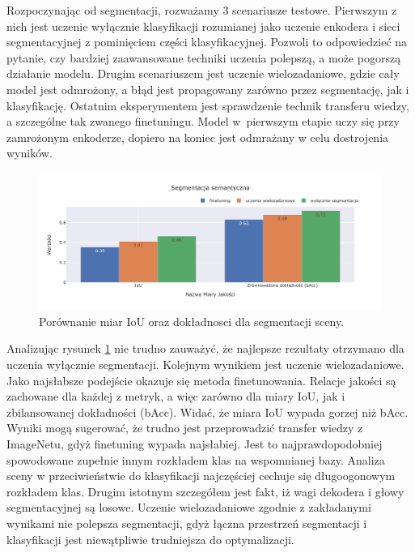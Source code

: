 \vspace{0.5cm}
Rozpoczynając od segmentacji, rozważamy 3 scenariusze testowe. Pierwszym z nich jest uczenie wyłącznie klasyfikacji rozumianej jako uczenie enkodera i sieci segmentacyjnej z pominięciem części klasyfikacyjnej. Pozwoli to odpowiedzieć na pytanie, czy bardziej zaawansowane techniki uczenia polepszą, a może pogorszą działanie modelu. Drugim scenariuszem jest uczenie wielozadaniowe, gdzie cały model jest odmrożony, a błąd jest propagowany zarówno przez segmentację, jak i klasyfikację. Ostatnim eksperymentem jest sprawdzenie technik transferu wiedzy, a szczególne tak zwanego finetuningu. Model w~pierwszym etapie uczy się przy zamrożonym enkoderze, dopiero na koniec jest odmrażany w celu dostrojenia wyników.

\begin{figure}[ht!]
    \centering
    \includegraphics[width=\textwidth]{img/pl-res/Segmentacja-semantyczna.jpeg}
    \caption{Porównanie miar IoU oraz dokładnosci dla segmentacji sceny.}
    \label{fig:macro-segmentation}
\end{figure}

Analizując rysunek \ref{fig:macro-segmentation} nie trudno zauważyć, że najlepsze rezultaty otrzymano dla uczenia wyłącznie segmentacji. Kolejnym wynikiem jest uczenie wielozadaniowe. Jako najsłabsze podejście okazuje się metoda finetunowania. Relacje jakości są zachowane dla każdej z metryk, a więc zarówno dla miary IoU, jak i zbilansowanej dokładności (bAcc). Widać, że miara IoU wypada gorzej niż bAcc. Wyniki mogą sugerować, że trudno jest przeprowadzić transfer wiedzy z ImageNetu, gdyż finetuning wypada najsłabiej. Jest to najprawdopodobniej spowodowane zupełnie innym rozkładem klas na wspomnianej bazy. Analiza sceny w przeciwieństwie do klasyfikacji najczęściej cechuje się długoogonowym rozkładem klas. Drugim istotnym szczegółem jest fakt, iż wagi dekodera i głowy segmentacyjnej są losowe. Uczenie wielozadaniowe zgodnie z zakładanymi wynikami nie polepsza segmentacji, gdyż łączna przestrzeń segmentacji i klasyfikacji jest niewątpliwie trudniejsza do optymalizacji.


